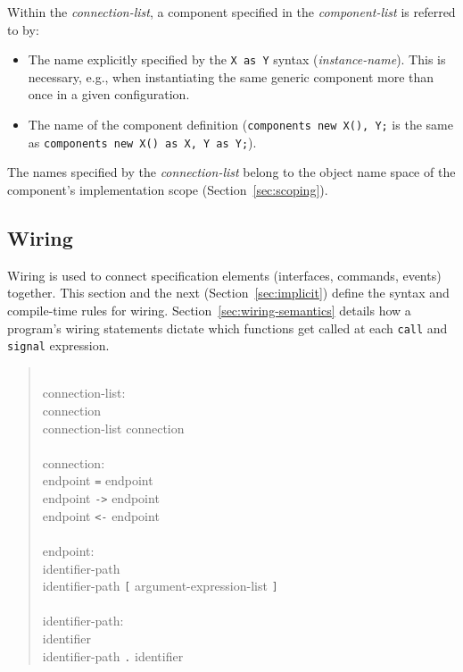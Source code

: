 \documentclass[11pt,letterpaper]{article}
\newcommand{\kw}[1]{{\tt #1}}
\newcommand{\code}[1]{{\tt #1}}
\newcommand{\grammarshift}{\vspace*{-.7cm}}
\newcommand{\grammarindent}{\hspace*{2cm}\= \\ \kill}
\begin{document}
Within the \emph{connection-list}, a component specified in the 
\emph{component-list} is referred to by:
\begin{itemize}
\item The name explicitly specified by the \code{X as Y} syntax
(\emph{instance-name}). This is necessary, e.g., when instantiating the
same generic component more than once in a given configuration.
\item The name of the component definition (\code{components new X(), Y;} is
the same as \code{components new X() as X, Y as Y;}).
\end{itemize}
The names specified by the \emph{connection-list} belong to the object name
space of the component's implementation scope (Section~\ref{sec:scoping}).

\subsection{Wiring}
\label{sec:wiring}

Wiring is used to connect specification elements (interfaces, commands,
events) together. This section and the next (Section~\ref{sec:implicit})
define the syntax and compile-time rules for
wiring. Section~\ref{sec:wiring-semantics} details how a program's wiring
statements dictate which functions get called at each \kw{call} and
\kw{signal} expression.  \begin{quote} \grammarshift \em \begin{tabbing}
\grammarindent
connection-list:\\
\>	connection\\
\>	connection-list connection\\
\\
connection:\\
\>	endpoint \kw{=} endpoint\\
\>	endpoint \kw{->} endpoint\\
\>	endpoint \kw{<-} endpoint\\
\\
endpoint:\\
\>	identifier-path \\
\>	identifier-path \kw{[} argument-expression-list \kw{]}\\
\\
identifier-path:\\
\>	identifier\\
\>	identifier-path \kw{.} identifier\\
\end{tabbing} \end{quote}
\end{document}
